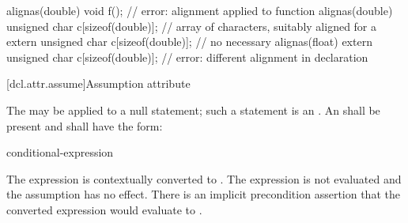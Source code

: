 \pnum
\begin{example}
\begin{codeblock}
alignas(double) void f();                           // error: alignment applied to function
alignas(double) unsigned char c[sizeof(double)];    // array of characters, suitably aligned for a 
extern unsigned char c[sizeof(double)];             // no  necessary
alignas(float)
  extern unsigned char c[sizeof(double)];           // error: different alignment in declaration
\end{codeblock}
\end{example}

[dcl.attr.assume]{Assumption attribute}

\pnum
The   may be applied to a null statement;
such a statement is an .
An  shall be present and
shall have the form:
\begin{ncsimplebnf}
\terminal{(} conditional-expression \terminal{)}
\end{ncsimplebnf}
The expression is contextually converted to .
The expression is not evaluated and
the assumption has no effect.
There is an implicit precondition assertion
that the converted expression
would evaluate to .
%
%
%
%
%

